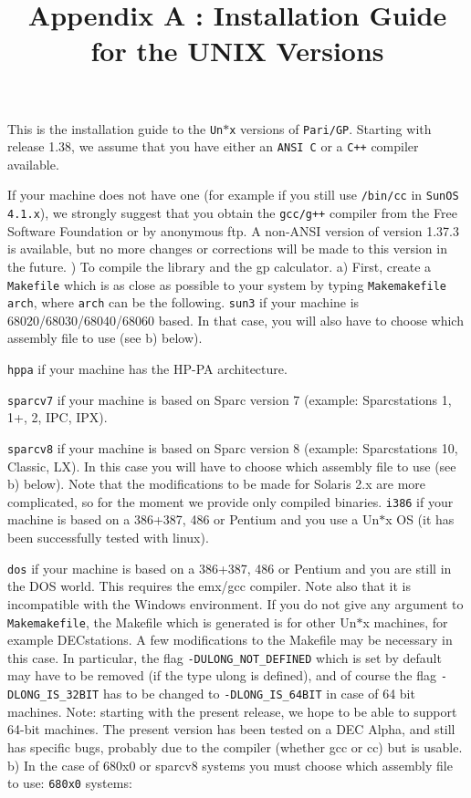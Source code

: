 \title{Appendix A : Installation Guide for the UNIX Versions}


This is the installation guide to the {\tt Un$*$x} versions of {\tt Pari/GP}.
Starting with release 1.38, we assume that you have either an {\tt ANSI C}
or a {\tt C++} compiler available.

If your machine does not have one (for example if you still use {\tt /bin/cc}
in {\tt SunOS 4.1.x}), we strongly suggest that you obtain the {\tt gcc/g++}
compiler from the Free Software Foundation or by anonymous ftp. A non-ANSI
version of version 1.37.3 is available, but no more changes or corrections
will be made to this version in the future.
) To compile the library and the gp calculator.
\smallskip
   a) First, create a {\tt Makefile} which is as close as possible to your
      system by typing {\tt Makemakefile arch}, where {\tt arch} can be the
      following.
\smallskip
{\tt sun3} if your machine is 68020/68030/68040/68060 based. In that case, you 
        will also have to choose which assembly file to use (see b) below).

{\tt hppa} if your machine has the HP-PA architecture.

{\tt sparcv7} if your machine is based on Sparc version 7 (example: 
       Sparcstations 1, 1+, 2, IPC, IPX).

{\tt sparcv8} if your machine is based on Sparc version 8 (example:
        Sparcstations 10, Classic, LX). In this case you will have to choose
        which assembly file to use (see b) below). Note that the modifications
        to be made for Solaris 2.x are more complicated, so for the moment we
        provide	only compiled binaries.
{\tt i386} if your machine is based on a 386+387, 486 or Pentium and you use a
        Un$*$x OS (it has been successfully tested with linux).

{\tt dos} if your machine is based on a 386+387, 486 or Pentium and you are
        still in the DOS world. This requires the emx/gcc compiler. Note also
        that it is incompatible with the Windows environment.
\smallskip
	If you do not give any argument to {\tt Makemakefile}, the Makefile
        which is generated is for other Un$*$x machines, for example 
	DECstations. A few modifications to the Makefile may be necessary in
	this case. In particular, the flag {\tt -DULONG\_NOT\_DEFINED} which
	is set by default may have to be removed (if the type ulong is 
	defined), and of course the flag {\tt -DLONG\_IS\_32BIT} has to be
	changed to {\tt -DLONG\_IS\_64BIT} in case of 64 bit machines.
\smallskip
	Note: starting with the present release, we hope to be able to support
	64-bit machines. The present version has been tested on a DEC Alpha,
	and still has specific bugs, probably due to the compiler (whether gcc
	or cc) but is usable.
\medskip
   b) In the case of 680x0 or sparcv8 systems you must choose which assembly
      file to use:
\smallskip
{\tt 680x0} systems:
  
